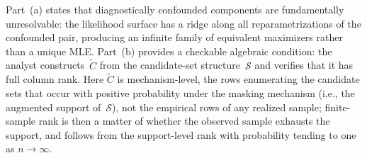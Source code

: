 \documentclass[11pt]{article}
\theoremstyle{definition}
\theoremstyle{plain}
\begin{document}
Part~(a) states that diagnostically confounded components are
fundamentally unresolvable: the likelihood surface has a ridge along
all reparametrizations of the confounded pair, producing an infinite
family of equivalent maximizers rather than a unique MLE.
Part~(b) provides a checkable algebraic condition: the analyst
constructs~$\tilde{C}$ from the candidate-set
structure~$\mathcal{S}$ and verifies that it has full column rank.
Here $\tilde{C}$ is mechanism-level, the rows enumerating the
candidate sets that occur with positive probability under the masking
mechanism (i.e., the augmented support of~$\mathcal{S}$), not the
empirical rows of any realized sample; finite-sample rank is then a
matter of whether the observed sample exhausts the support, and
follows from the support-level rank with probability tending to one
as $n \to \infty$.
\end{document}
